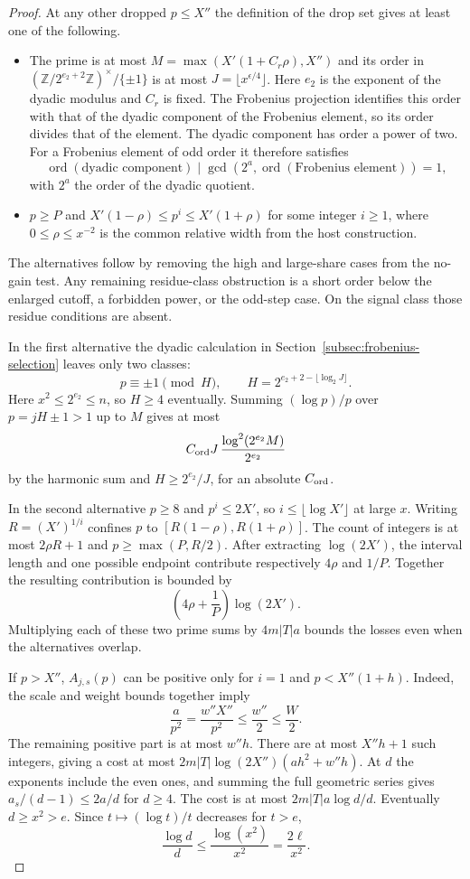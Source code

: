 \begin{proof}
At any other dropped \(p\le X''\) the definition of the drop set
gives at least one of the following.
\begin{itemize}
\item The prime is at most \(M=\max(X'(1+C_r\rho),X'')\) and its
order in \((\mathbb Z/2^{e_2+2}\mathbb Z)^\times/\{\pm1\}\)
is at most \(J=\lfloor x^{\epsilon/4}\rfloor\). Here \(e_2\) is
the exponent of the dyadic modulus and \(C_r\) is fixed. The Frobenius
projection identifies this order with that of the dyadic component
of the Frobenius element, so its order divides that of the element. The dyadic component has order a power of two. For a Frobenius element of odd order it therefore satisfies
\[
 \operatorname{ord}(\text{dyadic component})\mid\gcd(2^a,\operatorname{ord}(\text{Frobenius element}))=1,
\]
with \(2^a\) the order of the dyadic quotient.
\item \(p\ge P\) and \(X'(1-\rho)\le p^i\le X'(1+\rho)\) for some
integer \(i\ge1\), where \(0\le\rho\le x^{-2}\) is the common
relative width from the host construction.
\end{itemize}
The alternatives follow by removing the high and large-share cases
from the no-gain test. Any remaining residue-class obstruction is
a short order below the enlarged cutoff, a forbidden power, or the
odd-step case. On the signal class those residue conditions are absent.

In the first alternative the dyadic calculation in Section~\ref{subsec:frobenius-selection} leaves only two classes:
\[
 p\equiv\pm1\pmod H,\qquad H=2^{e_2+2-\lfloor\log_2 J\rfloor}.
\]
Here \(x^2\le 2^{e_2}\le n\), so \(H\ge4\) eventually.
Summing \((\log p)/p\) over \(p=jH\pm1>1\) up to \(M\) gives at most
\[
 C_{\rm ord} J\,\frac{\log^2(2^{e_2}M)}{2^{e_2}}
\]
by the harmonic sum and \(H\ge 2^{e_2}/J\), for an absolute
\(C_{\rm ord}\).

In the second alternative \(p\ge8\) and
\(p^i\le2X'\), so \(i\le\lfloor\log X'\rfloor\) at large \(x\).
Writing \(R=(X')^{1/i}\) confines \(p\) to
\([R(1-\rho),R(1+\rho)]\). The count of integers is at most
\(2\rho R+1\) and \(p\ge\max(P,R/2)\). After extracting \(\log(2X')\), the interval length and one possible endpoint contribute respectively \(4\rho\) and \(1/P\). Together the resulting contribution is bounded by
\[
 \left(4\rho+\frac1P\right)\log(2X').
\]
Multiplying each of these two prime sums by \(4m|T|a\) bounds
the losses even when the alternatives overlap.

If \(p>X''\), \(A_{j,s}(p)\) can be positive only for \(i=1\) and
\(p<X''(1+h)\). Indeed, the scale and weight bounds together imply
\[
 \frac{a}{p^2}=\frac{w''X''}{p^2}\le \frac{w''}{2}\le\frac{W}{2}.
\] The remaining positive part is at most \(w''h\).
There are at most \(X''h+1\) such integers, giving a cost at most
\(2m|T|\log(2X'')(ah^2+w''h)\). At \(d\) the exponents include
the even ones, and summing the full geometric series gives
\(a_s/(d-1)\le 2a/d\) for \(d\ge4\). The cost is at most
\(2m|T|a\log d/d\). Eventually \(d\ge x^2>e\). Since \(t\mapsto(\log t)/t\) decreases for \(t>e\),
\[
 \frac{\log d}{d}\le\frac{\log(x^2)}{x^2}=\frac{2\ell}{x^2}.
\]


\end{proof}
